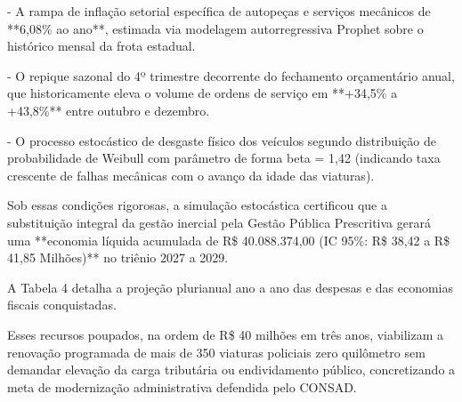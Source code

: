 \documentclass[12pt,a4paper]{article}
\begin{document}
- A rampa de inflação setorial específica de autopeças e serviços mecânicos de **6,08\% ao ano**, estimada via modelagem autorregressiva Prophet sobre o histórico mensal da frota estadual.

- O repique sazonal do 4º trimestre decorrente do fechamento orçamentário anual, que historicamente eleva o volume de ordens de serviço em **+34,5\% a +43,8\%** entre outubro e dezembro.

- O processo estocástico de desgaste físico dos veículos segundo distribuição de probabilidade de Weibull com parâmetro de forma beta = 1,42 (indicando taxa crescente de falhas mecânicas com o avanço da idade das viaturas).

Sob essas condições rigorosas, a simulação estocástica certificou que a substituição integral da gestão inercial pela Gestão Pública Prescritiva gerará uma **economia líquida acumulada de R\$ 40.088.374,00 (IC 95\%: R\$ 38,42 a R\$ 41,85 Milhões)** no triênio 2027 a 2029.

A Tabela 4 detalha a projeção plurianual ano a ano das despesas e das economias fiscais conquistadas.

\begin{table}[htbp]
\centering
\small
{}
\end{table}

Esses recursos poupados, na ordem de R\$ 40 milhões em três anos, viabilizam a renovação programada de mais de 350 viaturas policiais zero quilômetro sem demandar elevação da carga tributária ou endividamento público, concretizando a meta de modernização administrativa defendida pelo CONSAD.
\end{document}

